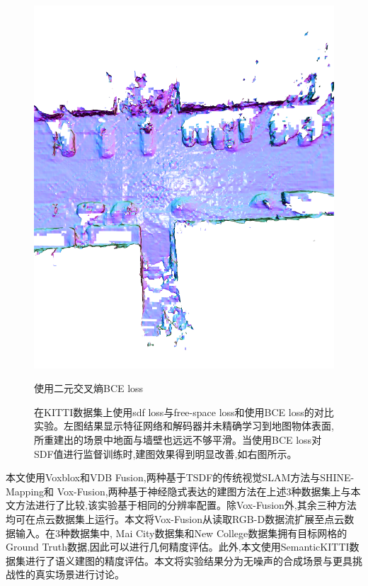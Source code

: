 \begin{figure}[htbp]
\begin{minipage}{0.45\linewidth}
		\includegraphics[width=1\linewidth]{figures/kittiobce.png}
        \caption*{使用二元交叉熵BCE loss}
	\end{minipage}
    \caption{在KITTI数据集上使用sdf loss与free-space loss和使用BCE loss的对比实验。左图结果显示特征网络和解码器并未精确学习到地图物体表面,所重建出的场景中地面与墙壁也远远不够平滑。当使用BCE loss对SDF值进行监督训练时,建图效果得到明显改善,如右图所示。}\label{becornot}
\end{figure}
\clearpage
本文使用Voxblox和VDB Fusion,两种基于TSDF的传统视觉SLAM方法与SHINE-Mapping和 Vox-Fusion,两种基于神经隐式表达的建图方法在上述3种数据集上与本文方法进行了比较,该实验基于相同的分辨率配置。除Vox-Fusion外,其余三种方法均可在点云数据集上运行。本文将Vox-Fusion从读取RGB-D数据流扩展至点云数据输入。在3种数据集中, Mai City数据集和New College数据集拥有目标网格的Ground Truth数据,因此可以进行几何精度评估。此外,本文使用SemanticKITTI数据集进行了语义建图的精度评估。本文将实验结果分为无噪声的合成场景与更具挑战性的真实场景进行讨论。
